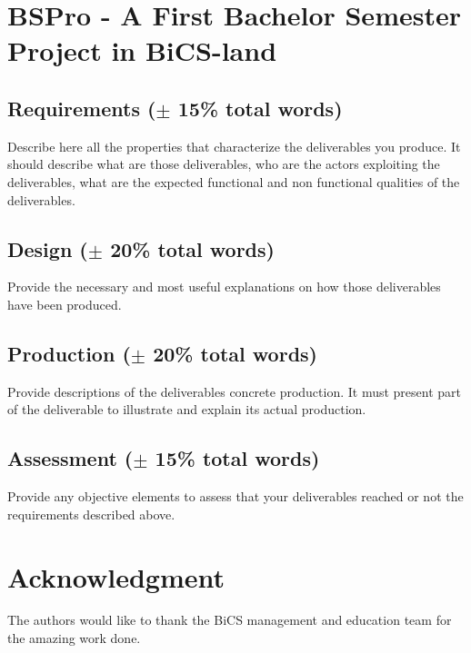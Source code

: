 \section{BSPro - A First Bachelor Semester Project in BiCS-land}
\subsection{Requirements ($\pm$ 15\% total words)}
Describe here all the properties that characterize the deliverables you produce. It should describe what are those deliverables, who are the actors exploiting the deliverables, what are the expected functional and non functional qualities of the deliverables.

\subsection{Design ($\pm$ 20\% total words)}
Provide the necessary and most useful explanations on how those deliverables have been produced.
\subsection{Production ($\pm$ 20\% total words)}
Provide descriptions of the deliverables concrete production. It must present part of the deliverable to illustrate and explain its actual production.
\subsection{Assessment ($\pm$ 15\% total words)}
Provide any objective elements to assess that your deliverables reached or not the requirements described above. 
\section*{Acknowledgment}
The authors would like to thank the BiCS management and education team for the amazing work done.